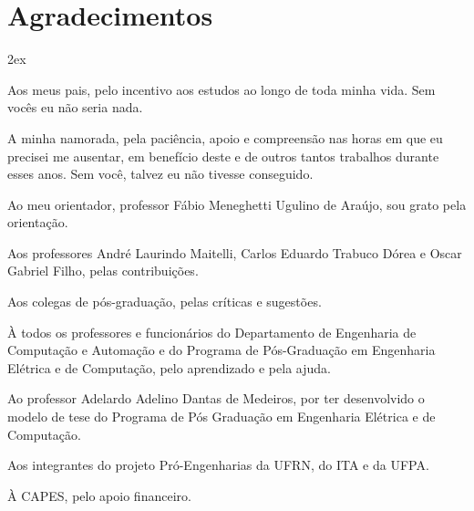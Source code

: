 \chapter*{Agradecimentos}
\thispagestyle{empty}

\begin{trivlist}  \itemsep 2ex

\item Aos meus pais, pelo incentivo aos estudos ao longo de toda minha vida. Sem
vocês eu não seria nada.

\item A minha namorada, pela paciência, apoio e compreensão nas horas em que eu
precisei me ausentar, em benefício deste e de outros tantos trabalhos durante
esses anos. Sem você, talvez eu não tivesse conseguido.

\item Ao meu orientador, professor Fábio Meneghetti Ugulino de Araújo, sou grato
pela orientação.

\item Aos professores André Laurindo Maitelli, Carlos Eduardo Trabuco Dórea e
Oscar Gabriel Filho, pelas contribuições.

\item Aos colegas de pós-graduação, pelas críticas e sugestões.

\item À todos os professores e funcionários do Departamento de Engenharia de
Computação e Automação e do Programa de Pós-Graduação em Engenharia Elétrica e
de Computação, pelo aprendizado e pela ajuda.

\item Ao professor Adelardo Adelino Dantas de Medeiros, por ter desenvolvido o
modelo de tese do Programa de Pós Graduação em Engenharia Elétrica e de
Computação.

\item Aos integrantes do projeto Pró-Engenharias da UFRN, do ITA e da UFPA.

\item À CAPES, pelo apoio financeiro.

\end{trivlist}
